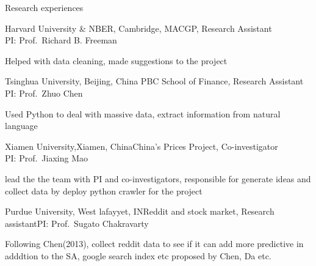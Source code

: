 \documentclass{resume} %
\begin{document}
\begin{rSection}{Research experiences}

\begin{rSubsection}{Harvard University & NBER, Cambridge, MA}{CGP, Research Assistant
\\} {PI: Prof.\ Richard B. Freeman}
\item Helped with data cleaning, made suggestions to the project
 
\end{rSubsection}  


\begin{rSubsection}{Tsinghua University, Beijing, China}{ PBC School of Finance, Research Assistant
\\}{PI: Prof.\ Zhuo Chen}{} 
\item Used Python to deal with massive data, extract information from natural language 

\end{rSubsection}



\begin{rSubsection}{Xiamen University,Xiamen, China}{China's Prices Project,  Co-investigator
\\}{PI: Prof.\ Jiaxing Mao}{} 

\item lead the the team with PI and co-investigators, responsible for generate ideas and collect data by deploy python crawler for the project

\end{rSubsection}


\begin{rSubsection}{Purdue University, West lafayyet, IN}{Reddit and stock market, Research assistant}{PI: Prof.\ Sugato Chakravarty}    

\item Following Chen(2013), collect reddit data to see if it can add more predictive in adddtion to the SA, google search index etc proposed by Chen, Da etc.


\end{rSubsection} 

\end{rSection} 


\end{document}
